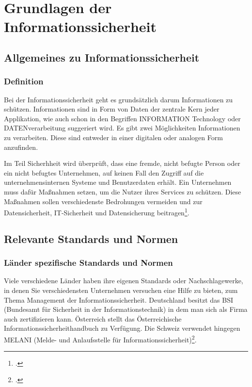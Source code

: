\chapter{Grundlagen der Informationssicherheit}
\strahlhofer

\section{Allgemeines zu Informationssicherheit} 
\subsection{Definition}
Bei der Informationssicherheit geht es grundsätzlich darum Informationen zu schützen. Informationen sind in Form von Daten der zentrale Kern jeder Applikation, wie auch schon in den Begriffen INFORMATION Technology oder DATENverarbeitung suggeriert wird. Es gibt zwei Möglichkeiten Informationen zu verarbeiten. Diese sind entweder in einer digitalen oder analogen Form anzufinden.

Im Teil Sicherhheit wird überprüft, dass eine fremde, nicht befugte Person oder ein nicht befugtes Unternehmen, auf keinen Fall den Zugriff auf die unternehmensinternen Systeme und Benutzerdaten erhält. Ein Unternehmen muss dafür Maßnahmen setzen, um die Nutzer ihres Services zu schützen. Diese Maßnahmen sollen verschiedenste Bedrohungen vermeiden und zur Datensicherheit, IT-Sicherheit und Datensicherung beitragen\footcite{Lehrunterlagen-HTL-cloud}.


\section{Relevante Standards und Normen}
\subsection{Länder spezifische Standards und Normen}
Viele verschiedene Länder haben ihre eigenen Standards oder Nachschlagewerke, in denen Sie verschiedensten Unternehmen versuchen eine Hilfe zu bieten, zum Thema Management der Informationssicherheit.
Deutschland besitzt das BSI (Bundesamt für Sicherheit in der Informationstechnik) in dem man sich als Firma auch zertifizieren kann. Österreich stellt das Österreichische Informationssicherheithandbuch zu Verfügung. Die Schweiz verwendet hingegen MELANI (Melde- und Anlaufsstelle für Informationssicherheit)\footcite{Lehrunterlagen-HTL-cloud}.


